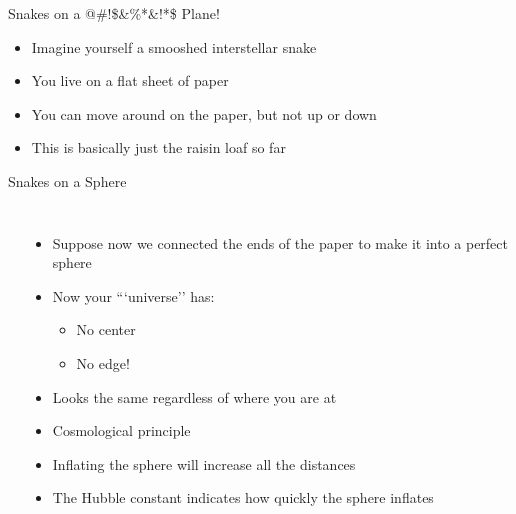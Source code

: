 \documentclass[pdf, aspectratio=169]{beamer}
\begin{document}
\begin{frame}{Snakes on a @\#!\$\&\%*\&!*\$ Plane!}
  \begin{itemize}
	\item Imagine yourself a smooshed interstellar snake
	\item You live on a flat sheet of paper
	\item You can move around on the paper, but not up or down
	\begin{center}
	\end{center}
	\item This is basically just the raisin loaf so far
  \end{itemize}
\end{frame}

\begin{frame}{Snakes on a Sphere}
  \begin{columns}
	\begin{center}
	\end{center}

	\begin{itemize}
	  \item Suppose now we connected the ends of the paper to make it into a perfect sphere
	  \item Now your ```universe'' has:
		\begin{itemize}
		  \item No center
		  \item No edge!
		\end{itemize}
	  \item Looks the same regardless of where you are at
	  \item Cosmological principle \only<2->{\textcolor{green!70!black}{\LARGE\checkmark}}
	  \item Inflating the sphere will increase all the distances
	  \item The Hubble constant indicates how quickly the sphere inflates
	\end{itemize}
  \end{columns}
\end{frame}
\end{document}
